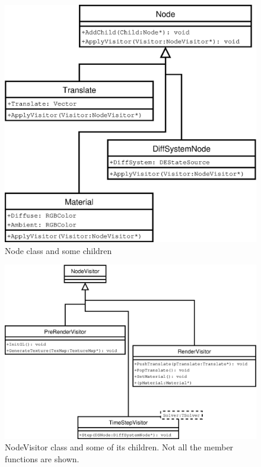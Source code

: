 \begin{figure}
    \centering
    \includegraphics[height=0.5\textheight]{Node}    
    \caption{\label{Fig:Node}Node class and some children}
\end{figure}

\begin{figure}
    \centering
    \includegraphics[height=0.5\textheight]{NodeVisitor}
    \caption{\label{Fig:NodeVisitor}NodeVisitor class and some of its children. Not all the member functions are shown.}
\end{figure}

